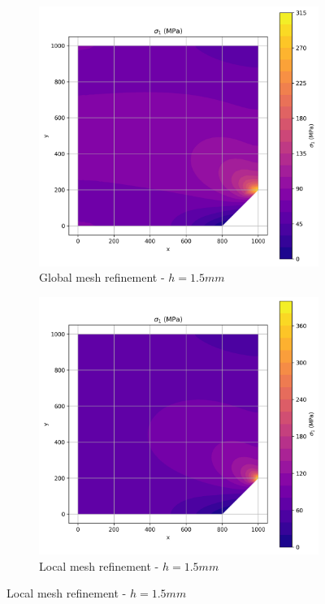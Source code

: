 \begin{figure}[H]
  \centering
  \begin{subfigure}[b]{0.45\textwidth}
    \centering
    \includegraphics[width=\textwidth]{GRAFICOS/Quad4/1.5mm_global/resultados - sigma_1.png}
    \caption{Global mesh refinement - $h=1.5mm$}
    \label{fig:img12}
  \end{subfigure}
  \hfill
  \begin{subfigure}[b]{0.45\textwidth}
    \centering
    \includegraphics[width=\textwidth]{GRAFICOS/Quad4/1.5mm_local/resultados - sigma_1.png}
    \caption{Local mesh refinement - $h=1.5mm$}
    \label{fig:img22}
  \end{subfigure}
\end{figure}

